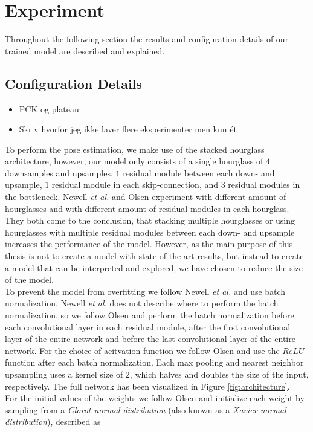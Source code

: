 \documentclass[./main.tex]{subfiles}
\begin{document}
\section{Experiment}
Throughout the following section the results and configuration details of our trained model are described and explained.

\subsection{Configuration Details}
\begin{itemize}
    \item PCK og plateau
    \item Skriv hvorfor jeg ikke laver flere eksperimenter men kun ét
\end{itemize}
To perform the pose estimation, we make use of the stacked hourglass architecture, however, our model only consists of a single hourglass of $4$ downsamples and upsamples, $1$ residual module between each down- and upsample, $1$ residual module in each skip-connection, and $3$ residual modules in the bottleneck. Newell \textit{et al.} \cite{Newell} and Olsen \cite{Camilla} experiment with different amount of hourglasses and with different amount of residual modules in each hourglass. They both come to the conclusion, that stacking multiple hourglasses or using hourglasses with multiple residual modules between each down- and upsample increases the performance of the model. However, as the main purpose of this thesis is not to create a model with state-of-the-art results, but instead to create a model that can be interpreted and explored, we have chosen to reduce the size of the model. \\
To prevent the model from overfitting we follow Newell \textit{et al.} \cite{Newell} and use batch normalization. Newell \textit{et al.} does not describe where to perform the batch normalization, so we follow Olsen \cite{Camilla} and perform the batch normalization before each convolutional layer in each residual module, after the first convolutional layer of the entire network and before the last convolutional layer of the entire network. For the choice of acitvation function we follow Olsen \cite{Camilla} and use the $ReLU$-function after each batch normalization. Each max pooling and nearest neighbor upsampling uses a kernel size of $2$, which halves and doubles the size of the input, respectively. The full network has been visualized in Figure \ref{fig:architecture}. \\
For the initial values of the weights we follow Olsen \cite{Camilla} and initialize each weight by sampling from a \textit{Glorot normal distribution} (also known as a \textit{Xavier normal distribution}), described as
\end{document}
